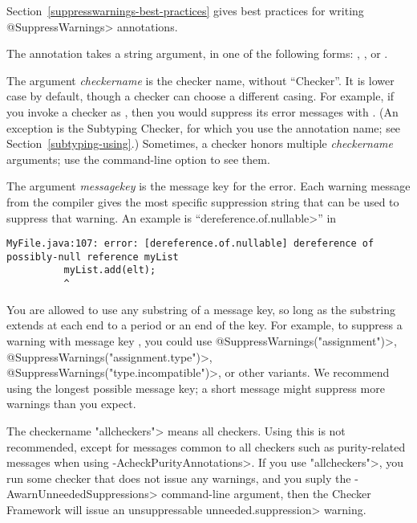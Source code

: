 Section~\ref{suppresswarnings-best-practices} gives best practices for
writing \<@SuppressWarnings> annotations.



The  annotation takes a string argument, in one of
the following forms:
,
,
or
.

The argument \emph{checkername} is the checker name, without ``Checker''.
It is lower case by default, though a checker can choose a different casing.
For
example, if you invoke a checker as
,
then you would suppress its error messages with
.  (An exception is the Subtyping
Checker, for which you use the annotation name; see
Section~\ref{subtyping-using}.)
Sometimes, a checker honors multiple \emph{checkername} arguments; use
the  command-line option to see them.

The argument \emph{messagekey} is the message key for the error.
Each warning message from the compiler gives the most specific
suppression string that can be used to suppress that warning.
An example is ``\<dereference.of.nullable>'' in

\begin{smaller}
\begin{Verbatim}
MyFile.java:107: error: [dereference.of.nullable] dereference of possibly-null reference myList
          myList.add(elt);
          ^
\end{Verbatim}
\end{smaller}

\noindent
You are allowed to use any substring of a message key, so long as the
substring extends at each end to a period or an end of the key.  For
example, to suppress a warning with message key
, you could use
\<@SuppressWarnings("assignment")>,
\<@SuppressWarnings("assignment.type")>,
\<@SuppressWarnings("type.incompatible")>, or other variants.
We recommend using
the longest possible message key; a short message might suppress more
warnings than you expect.

The checkername \<"allcheckers"> means all checkers.  Using this is not
recommended, except for messages common to all checkers such as
purity-related messages when using \<-AcheckPurityAnnotations>.  If you use
\<"allcheckers">, you run some checker that does not issue any warnings,
and you suply the \<-AwarnUnneededSuppressions> command-line argument, then
the Checker Framework will issue an unsuppressable \<unneeded.suppression>
warning.

